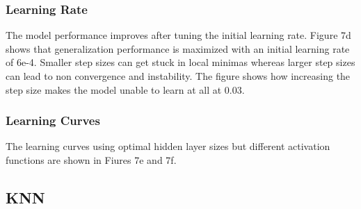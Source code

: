 \documentclass{article}
\begin{document}
\subsubsection*{Learning Rate}
The model performance improves after tuning the initial learning rate. Figure 7d shows that generalization performance is maximized with an initial learning rate of 6e-4. Smaller step sizes can get stuck in local minimas whereas larger step sizes can lead to non convergence and instability. The figure shows how increasing the step size makes the model unable to learn at all at 0.03.

\subsubsection*{Learning Curves}
The learning curves using optimal hidden layer sizes but different activation functions are shown in Fiures 7e and 7f. 

\subsection{KNN}
\end{document}
